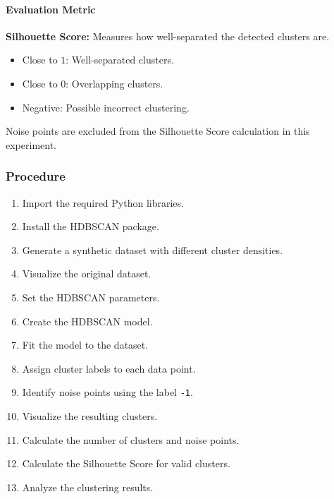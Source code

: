 \documentclass[a4paper,11pt]{article}
\begin{document}
\paragraph{Evaluation Metric}
\textbf{Silhouette Score:} Measures how well-separated the detected clusters are.
\begin{itemize}
    \item Close to $1$: Well-separated clusters.
    \item Close to $0$: Overlapping clusters.
    \item Negative: Possible incorrect clustering.
\end{itemize}
Noise points are excluded from the Silhouette Score calculation in this experiment.

\subsubsection{Procedure}
\begin{enumerate}
    \item Import the required Python libraries.
    \item Install the HDBSCAN package.
    \item Generate a synthetic dataset with different cluster densities.
    \item Visualize the original dataset.
    \item Set the HDBSCAN parameters.
    \item Create the HDBSCAN model.
    \item Fit the model to the dataset.
    \item Assign cluster labels to each data point.
    \item Identify noise points using the label \texttt{-1}.
    \item Visualize the resulting clusters.
    \item Calculate the number of clusters and noise points.
    \item Calculate the Silhouette Score for valid clusters.
    \item Analyze the clustering results.
\end{enumerate}
\end{document}

